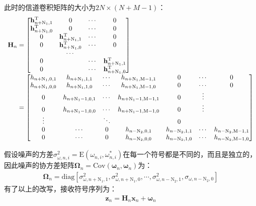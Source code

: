此时的信道卷积矩阵的大小为$2N\times(N+M-1)$：
\begin{eqnarray}
    \begin{array}{l@{\;=\;}l}
        \mathbf{H}_n&
        \begin{bmatrix}
            \mathbf{h}_{n+\mathrm{N}_1,1}^{\mathrm{T}}&0&\cdots&0\\
            \mathbf{h}_{n+\mathrm{N}_1,0}^{\mathrm{T}}&0&\cdots&0\\
            0&\mathbf{h}_{n+\mathrm{N}_1,1}^{\mathrm{T}}&\cdots&0\\
            0&\mathbf{h}_{n+\mathrm{N}_1,0}^{\mathrm{T}}&\cdots&0\\
           &\cdots&&\\ 
            0&&\cdots&\mathbf{h}_{n+\mathrm{N}_1,1}^{\mathrm{T}}\\
            0&\qquad&\cdots&\mathbf{h}_{n+\mathrm{N}_1,0}^{\mathrm{T}}\\
        \end{bmatrix}\\
        &\begin{bmatrix}
            h_{n+\mathrm{N}_1,0,1}&h_{n+\mathrm{N}_1,1,1}&\cdots&h_{n+\mathrm{N}_1,\mathrm{M}-1,1}&0&\cdots&0\\
            h_{n+\mathrm{N}_1,0,0}&h_{n+\mathrm{N}_1,1,0}&\cdots&h_{n+\mathrm{N}_1,\mathrm{M}-1,0}&0&\cdots&0\\
            0&h_{n+\mathrm{N}_1-1,0,1}&\cdots&h_{n+\mathrm{N}_1-1,\mathrm{M}-1,1}&0&\vdots\\
            0&h_{n+\mathrm{N}_1-1,0,0}&\cdots&h_{n+\mathrm{N}_1-1,\mathrm{M}-1,0}&0&\vdots\\
            \vdots&&\ddots&&0\\
            0&\cdots&0&h_{n-\mathrm{N}_2,0,1}&h_{n-\mathrm{N}_2,1,1}&\cdots&h_{n-\mathrm{N}_2,\mathrm{M}-1,1}\\
            0&\cdots&0&h_{n-\mathrm{N}_2,0,0}&h_{n-\mathrm{N}_2,1,0}&\cdots&h_{n-\mathrm{N}_2,\mathrm{M}-1,0}\\
        \end{bmatrix}
    \end{array}
    \label{equ:3.40}
\end{eqnarray}

假设噪声的方差$\sigma_{\omega,n,i}^2=\mathrm{E}(\omega_{n,i},\omega_{n,i}^*)$在每一个符号都是不同的，而且是独立的，因此噪声的协方差矩阵$\boldsymbol{\Omega}_n=\mathrm{Cov}(\boldsymbol{\omega}_n,\boldsymbol{\omega}_n)$为：
\begin{eqnarray}
    \boldsymbol{\Omega}_n=\mathrm{diag}[\sigma_{\omega,n+\mathrm{N}_1,1}^2,\sigma_{\omega,n+\mathrm{N}_1,0}^2,\cdots,\sigma_{\omega,n-\mathrm{N}_2,1}^2,\sigma_{\omega,n-\mathrm{N}_2,0}]
    \label{equ:3.41}
\end{eqnarray}
有了以上的改写，接收符号序列为：
\begin{eqnarray}
    \mathbf{z}_n=\mathbf{H}_n\mathbf{x}_n+\boldsymbol{\omega}_n
    \label{equ:3.42}
\end{eqnarray}

